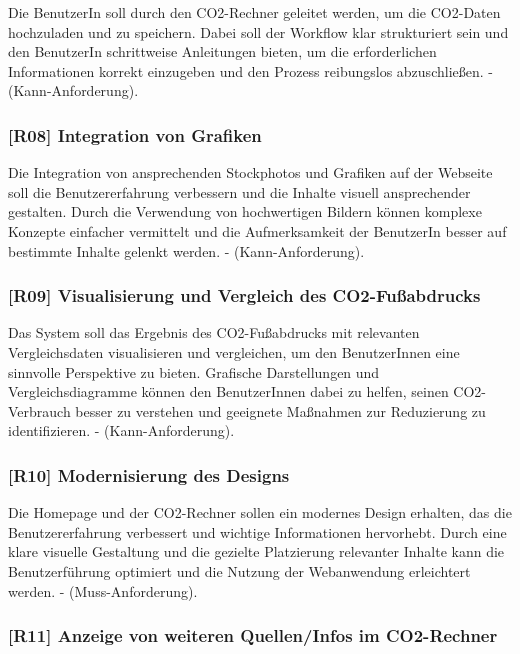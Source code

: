 Die BenutzerIn soll durch den CO2-Rechner geleitet werden, um die CO2-Daten hochzuladen und zu speichern. Dabei soll der Workflow klar strukturiert sein und den BenutzerIn schrittweise Anleitungen bieten, um die erforderlichen Informationen korrekt einzugeben und den Prozess reibungslos abzuschließen. - (Kann-Anforderung).

\subsubsection{[R08] Integration von Grafiken}

Die Integration von ansprechenden Stockphotos und Grafiken auf der Webseite soll die Benutzererfahrung verbessern und die Inhalte visuell ansprechender gestalten. Durch die Verwendung von hochwertigen Bildern können komplexe Konzepte einfacher vermittelt und die Aufmerksamkeit der BenutzerIn besser auf bestimmte Inhalte gelenkt werden. - (Kann-Anforderung).

\subsubsection{[R09] Visualisierung und Vergleich des CO2-Fußabdrucks}

Das System soll das Ergebnis des CO2-Fußabdrucks mit relevanten Vergleichsdaten visualisieren und vergleichen, um den BenutzerInnen eine sinnvolle Perspektive zu bieten. Grafische Darstellungen und Vergleichsdiagramme können den BenutzerInnen dabei zu helfen, seinen CO2-Verbrauch besser zu verstehen und geeignete Maßnahmen zur Reduzierung zu identifizieren. - (Kann-Anforderung).

\subsubsection{[R10] Modernisierung des Designs}

Die Homepage und der CO2-Rechner sollen ein modernes Design erhalten, das die Benutzererfahrung verbessert und wichtige Informationen hervorhebt. Durch eine klare visuelle Gestaltung und die gezielte Platzierung relevanter Inhalte kann die Benutzerführung optimiert und die Nutzung der Webanwendung erleichtert werden. - (Muss-Anforderung).

\subsubsection{[R11] Anzeige von weiteren Quellen/Infos im CO2-Rechner}

